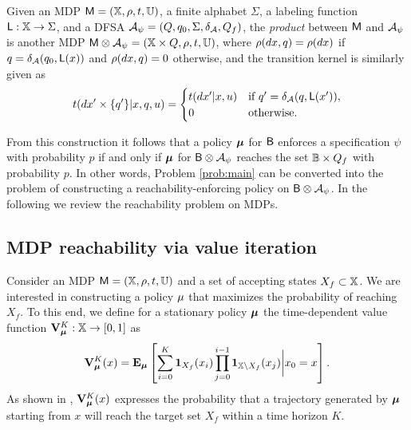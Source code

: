 \documentclass{ifacconf}
\newcommand{\ind}{\mathbf{1}}
\begin{document}
\begin{definition}
\label{def:product}
  Given an MDP $\mathsf{M} = ({\mathbb{X}}, \rho, t, {\mathbb{U}})$, a finite alphabet $\Sigma$, a labeling function $\mathsf{L} : {\mathbb{X}}\rightarrow\Sigma$, and a DFSA  $\mathcal{A}_\psi = (Q, q_0, \Sigma, \delta_{\mathcal{A}}, Q_f)$, the \emph{product} between $\mathsf{M}$ and $\mathcal{A}_\psi$ is another MDP $\mathsf{M}\otimes\mathcal{A}_\psi = ({\mathbb{X}} \times Q, \relax\rho, \relax{t}, {\mathbb{U}})$, where $\relax\rho(dx,q) = \rho(dx)$ if $q= \delta_{\mathcal{A}}(q_0,\mathsf L(x))$ and $ \relax\rho(dx,q) =0$ otherwise, and the transition kernel is similarly given as
  \begin{equation*}
    \relax{t}(d x'\times\{q'\}|x,q,u) = \begin{cases}t(dx'|x,u)& \text{if } q' =\delta_{\mathcal{A}}(q,\mathsf{L}(x')),\\ 0 & \text{otherwise.}  \end{cases}
  \end{equation*}
\end{definition}

From this construction it follows that a policy ${\boldsymbol{\mu}}$ for $\mathsf{B}$ enforces a specification $\psi$ with probability $p$ if and only if ${\boldsymbol{\mu}}$ for $\mathsf{B} \otimes \mathcal{A}_\psi$ reaches the set $\mathbb{B} \times Q_f$ with probability $p$. In other words, Problem \ref{prob:main} can be converted into the problem of constructing a reachability-enforcing policy on $\mathsf{B} \otimes \mathcal{A}_\psi$. In the following we review the reachability problem on MDPs.

\subsection{MDP reachability via value iteration}

Consider an MDP $\mathsf{M} = ({\mathbb{X}}, \rho, t, {\mathbb{U}})$ and a set of accepting states $X_f \subset {\mathbb{X}}$. We are interested in constructing a policy ${\mu}$ that maximizes the probability of reaching $X_f$. To this end, we define for a stationary policy ${\boldsymbol{\mu}}$ the time-dependent value function $\mathbf V_{\boldsymbol{\mu}}^K:{\mathbb{X}}\rightarrow [0,1]$ as
\begin{equation*}
\label{eq:Valfunc}
  \mathbf V^K_\polb(x)=\Ex_\polb \left[ \sum\limits_{ i=0 }^K \ind_{X_f}( x_i) \prod \limits_{\mathclap{j = 0}}^{i-1}\ind_{ \X \setminus X_f}( x_j ) \bigg| x_0 = x \right].
\end{equation*}
As shown in \citep{Abate1}, $\mathbf V_{\boldsymbol{\mu}}^K (x)$ expresses the probability that a trajectory generated by ${\boldsymbol{\mu}}$ starting from $x$ will reach the target set $X_f$ within a time horizon $K$.
\end{document}
